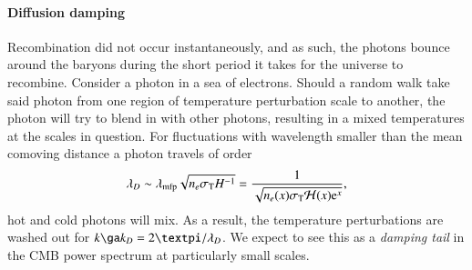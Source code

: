     \paragraph{Diffusion damping}
    Recombination did not occur instantaneously, and as such, the photons bounce around the baryons during the short period it takes for the universe to recombine. Consider a photon in a sea of electrons. Should a random walk take said photon from one region of temperature perturbation scale to another, the photon will try to blend in with other photons, resulting in a mixed temperatures at the scales in question. For fluctuations with wavelength smaller than the mean comoving distance a photon travels of order
    \begin{equation}
        \lambda_D \sim \lambda\ped{mfp}\sqrt{n_e\sigma\ped{T}H^{-1}} = \frac{1}{\sqrt{n_e(x)\sigma\ped{T}\Hp(x) \eu[x]}},
    \end{equation}
    hot and cold photons will mix. As a result, the temperature perturbations are washed out for $k\ga  k_D = 2\pi/\lambda_D$. We expect to see this as a \textit{damping tail} in the CMB power spectrum at particularly small scales. %


    

    



